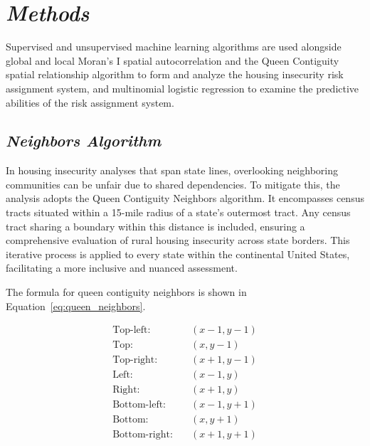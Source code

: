\section{\textit{Methods}}
Supervised and unsupervised machine learning algorithms are used alongside global and local Moran's I spatial autocorrelation and the Queen Contiguity spatial relationship algorithm to form and analyze the housing insecurity risk assignment system, and multinomial logistic regression to examine the predictive abilities of the risk assignment system.

\subsection{\textit{Neighbors Algorithm}}
In housing insecurity analyses that span state lines, overlooking neighboring communities can be unfair due to shared dependencies. To mitigate this, the analysis adopts the Queen Contiguity Neighbors algorithm. It encompasses census tracts situated within a 15-mile radius of a state's outermost tract. Any census tract sharing a boundary within this distance is included, ensuring a comprehensive evaluation of rural housing insecurity across state borders. This iterative process is applied to every state within the continental United States, facilitating a more inclusive and nuanced assessment.

The formula for queen contiguity neighbors is shown in Equation~\ref{eq:queen_neighbors}.

\begin{equation}
    \label{eq:queen_neighbors}
    \begin{aligned}
        \text{Top-left:} & \quad (x-1, y-1) \\
        \text{Top:} & \quad (x, y-1) \\
        \text{Top-right:} & \quad (x+1, y-1) \\
        \text{Left:} & \quad (x-1, y) \\
        \text{Right:} & \quad (x+1, y) \\
        \text{Bottom-left:} & \quad (x-1, y+1) \\
        \text{Bottom:} & \quad (x, y+1) \\
        \text{Bottom-right:} & \quad (x+1, y+1)
    \end{aligned}
\end{equation}


